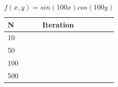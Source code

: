 \documentclass{article}
\begin{document}
\begin{enumerate}
\begin{table}[!htbp]
\centering
\caption{$f(x, y)=sin(100x)cos(100y)$ }
\label{my-label}
\begin{tabular}{|l|l|}
\hline
N   & Iteration \\ \hline
10  &        \\ \hline
50  &           \\ \hline
100 &           \\ \hline
500 &           \\ \hline
\end{tabular}
\end{table}




\end{enumerate}
\end{document}
